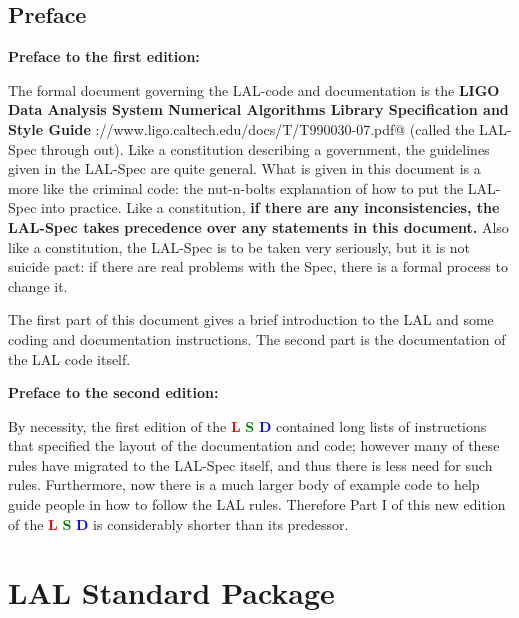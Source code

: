 \documentclass[oneside]{book}
\begin{document}
\newpage
{}
\nopagebreak
\tableofcontents


\chapter{Preface}

\bigskip
{\bf {\Huge{Preface to the first edition:}}}

\medskip
\noindent
The formal document governing the LAL-code and documentation is the
{\bf LIGO Data Analysis System Numerical Algorithms Library
Specification and Style Guide}
\verb@http://www.ligo.caltech.edu/docs/T/T990030-07.pdf@ (called the
LAL-Spec through out).  Like a constitution describing a government,
the guidelines given in the LAL-Spec are quite general. What is given
in this document  is a more like the criminal code: the nut-n-bolts
explanation of how to put the LAL-Spec into practice.  Like a
constitution, {\bf if there are any inconsistencies,  the LAL-Spec
takes precedence over any statements in this document.} Also like a
constitution, the LAL-Spec is to be taken very seriously, but it is
not suicide pact: if there are real problems with the Spec, there is a
formal process to change it.

The first part of this document gives a brief introduction to the LAL
and some coding and documentation instructions.  The second part is
the documentation of the LAL code itself.

\bigskip

\bigskip
\noindent
{\bf {\Huge{Preface to the second edition:}}}

\medskip
\noindent
By necessity, the first edition of the
{{\textcolor{red}{\bf L}} {\textcolor{green}{\bf S}} {\textcolor{blue}{\bf D}} }
contained long lists of instructions that specified the layout
of the documentation and code; however many of these rules have
migrated to the LAL-Spec itself, and thus there is less need for
such rules.  Furthermore, now there is a much
larger body of example code  to help guide people in how to
follow the LAL rules.  Therefore Part I of this new edition of
the 
{{\textcolor{red}{\bf L}} {\textcolor{green}{\bf S}} {\textcolor{blue}{\bf D}} }
is considerably shorter than its predessor.


\mainmatter

\part{LAL Standard Package}


\end{document}
